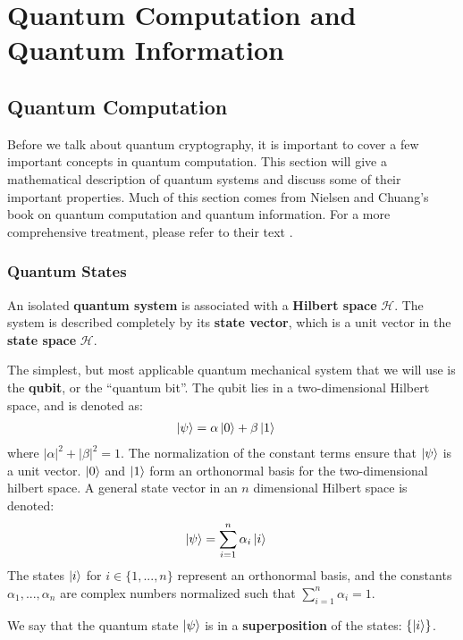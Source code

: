 \chapter{Quantum Computation and Quantum Information}
\label{ch:qc-prelim}

\section{Quantum Computation}
\label{sec:qc}

Before we talk about quantum cryptography, it is important to cover a few important concepts in quantum computation. This section will give a mathematical description of quantum systems and discuss some of their important properties. Much of this section comes from Nielsen and Chuang's book on quantum computation and quantum information. For a more comprehensive treatment, please refer to their text \cite{nielsen_quantum_2010}.

\subsection{Quantum States}

An isolated \textbf{quantum system} is associated with a \textbf{Hilbert space} $\mathcal{H}$. The system is described completely by its \textbf{state vector}, which is a unit vector in the \textbf{state space} $\mathcal{H}$.

The simplest, but most applicable quantum mechanical system that we will use is the \textbf{qubit}, or the ``quantum bit''. The qubit lies in a two-dimensional Hilbert space, and is denoted as:
\begin{align}
    \ket{\psi} &= \alpha \ket{0} + \beta \ket{1}
\end{align}
where $|\alpha|^2 + |\beta|^2 = 1$. The normalization of the constant terms ensure that $\ket{\psi}$ is a unit vector. $\ket{0}$ and $\ket{1}$ form an orthonormal basis for the two-dimensional hilbert space. A general state vector in an $n$ dimensional Hilbert space is denoted:
\begin{align}
    \ket{\psi} &= \sum_{i=1}^n \alpha_i\ket{i}
\end{align}
The states $\ket{i}$ for $i \in \{1,...,n\}$ represent an orthonormal basis, and the constants $\alpha_1,...,\alpha_n$ are complex numbers normalized such that $\sum_{i=1}^n \alpha_i = 1$.

We say that the quantum state $\ket{\psi}$ is in a \textbf{superposition} of the states: $\{\ket{i}\}$.

